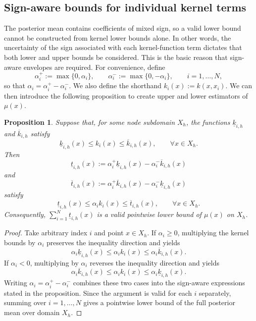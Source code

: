 \documentclass[pdflatex,sn-mathphys-num]{sn-jnl}%
\theoremstyle{thmstyleone}%
\newtheorem{proposition}[theorem]{Proposition}%
\theoremstyle{thmstyletwo}%
\theoremstyle{thmstylethree}%
\begin{document}
\subsection{Sign-aware bounds for individual kernel terms}

The posterior mean contains coefficients of mixed sign, so a valid lower bound cannot be constructed from kernel lower bounds alone. 
In other words, the uncertainty of the sign associated with each kernel-function term dictates that both lower and upper bounds be considered. 
This is the basic reason that sign-aware envelopes are required. For convenience, define
\[
\alpha_i^+ := \max\{0,\alpha_i\},
\qquad
\alpha_i^- := \max\{0,-\alpha_i\},
\qquad i=1,\ldots,N,
\]
so that $\alpha_i=\alpha_i^+-\alpha_i^-$. We also define the shorthand $k_i(x):=k(x,x_i)$. We can then introduce the following proposition to create upper and lower estimators of $\mu(x)$. 

\begin{proposition}
\label{prop:sign_aware_term_bounds}
Suppose that, for some node subdomain $X_h$, the functions $\underline{k}_{i,h}$ and $\overline{k}_{i,h}$ satisfy
\[
\underline{k}_{i,h}(x)\le k_i(x)\le \overline{k}_{i,h}(x),
\qquad \forall x\in X_h.
\]
Then
\[
\underline{t}_{i,h}(x):=\alpha_i^+\underline{k}_{i,h}(x)-\alpha_i^-\overline{k}_{i,h}(x)
\]
and
\[
\overline{t}_{i,h}(x):=\alpha_i^+\overline{k}_{i,h}(x)-\alpha_i^-\underline{k}_{i,h}(x)
\]
satisfy
\[
\underline{t}_{i,h}(x)\le \alpha_i k_i(x)\le \overline{t}_{i,h}(x),
\qquad \forall x\in X_h.
\]
Consequently, $\sum_{i=1}^N \underline{t}_{i,h}(x)$ is a valid pointwise lower bound of $\mu(x)$ on $X_h$.
\end{proposition}

\begin{proof}
Take arbitrary index $i$ and point $x\in X_h$. If $\alpha_i\ge0$, multiplying the kernel bounds by $\alpha_i$ preserves the inequality direction and yields
\[
\alpha_i\underline{k}_{i,h}(x)\le \alpha_i k_i(x)\le \alpha_i\overline{k}_{i,h}(x).
\]
If $\alpha_i<0$, multiplying by $\alpha_i$ reverses the inequality direction and yields
\[
\alpha_i\overline{k}_{i,h}(x)\le \alpha_i k_i(x)\le \alpha_i\underline{k}_{i,h}(x).
\]
Writing $\alpha_i=\alpha_i^+-\alpha_i^-$ combines these two cases into the sign-aware expressions stated in the proposition. Since the argument is valid for each $i$ separately, summing over $i=1,\ldots,N$ gives a pointwise lower bound of the full posterior mean over domain $X_h$.
\end{proof}
\end{document}
